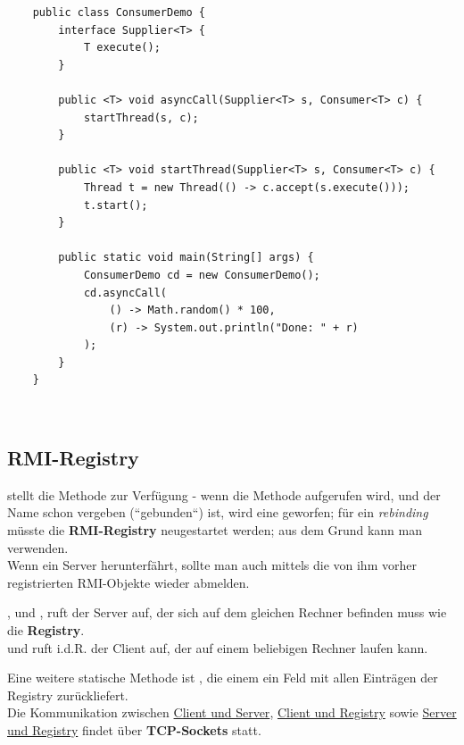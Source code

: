 \begin{verbatim}
    public class ConsumerDemo {
        interface Supplier<T> {
            T execute();
        }

        public <T> void asyncCall(Supplier<T> s, Consumer<T> c) {
            startThread(s, c);
        }

        public <T> void startThread(Supplier<T> s, Consumer<T> c) {
            Thread t = new Thread(() -> c.accept(s.execute()));
            t.start();
        }

        public static void main(String[] args) {
            ConsumerDemo cd = new ConsumerDemo();
            cd.asyncCall(
                () -> Math.random() * 100,
                (r) -> System.out.println("Done: " + r)
            );
        }
    }
\end{verbatim}\\

\subsection{RMI-Registry}

 stellt die Methode  zur Verfügung - wenn die Methode aufgerufen wird, und der Name schon vergeben (``gebunden``) ist, wird eine  geworfen; für ein \textit{rebinding} müsste die \textbf{RMI-Registry} neugestartet werden; aus dem Grund kann man  verwenden.\\
Wenn ein Server herunterfährt, sollte man auch mittels  die von ihm vorher registrierten RMI-Objekte wieder abmelden.\\

\begin{tcolorbox}
    ,  und , ruft der Server auf, der sich auf dem gleichen Rechner befinden muss wie die \textbf{Registry}.\\
    \noindent
     und  ruft i.d.R. der Client auf, der auf einem beliebigen Rechner laufen kann.
\end{tcolorbox}

\noindent
Eine weitere statische Methode ist , die einem ein Feld mit allen Einträgen der Registry zurückliefert.\\

\noindent
Die Kommunikation zwischen \ul{Client und Server}, \ul{Client und Registry} sowie \ul{Server und Registry} findet über \textbf{TCP-Sockets} statt.\\

